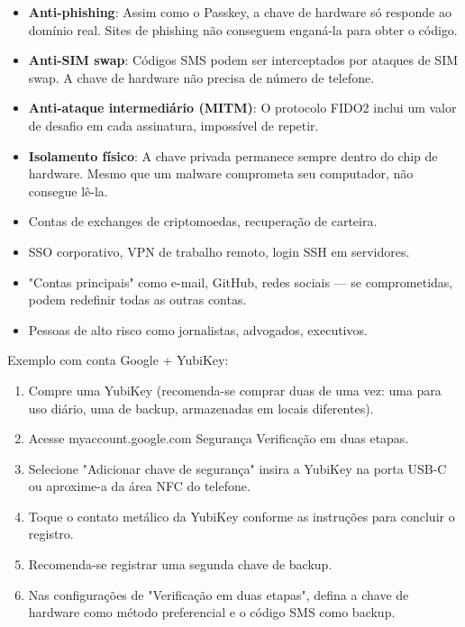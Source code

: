 
\begin{itemize}
  \item \textbf{Anti-phishing}: Assim como o Passkey, a chave de hardware só responde ao domínio real. Sites de phishing não conseguem enganá-la para obter o código.
  \item \textbf{Anti-SIM swap}: Códigos SMS podem ser interceptados por ataques de SIM swap. A chave de hardware não precisa de número de telefone.
  \item \textbf{Anti-ataque intermediário (MITM)}: O protocolo FIDO2 inclui um valor de desafio em cada assinatura, impossível de repetir.
  \item \textbf{Isolamento físico}: A chave privada permanece sempre dentro do chip de hardware. Mesmo que um malware comprometa seu computador, não consegue lê-la.
\end{itemize}


\begin{itemize}
  \item Contas de exchanges de criptomoedas, recuperação de carteira.
  \item SSO corporativo, VPN de trabalho remoto, login SSH em servidores.
  \item "Contas principais" como e-mail, GitHub, redes sociais — se comprometidas, podem redefinir todas as outras contas.
  \item Pessoas de alto risco como jornalistas, advogados, executivos.
\end{itemize}


Exemplo com conta Google + YubiKey:

\begin{enumerate}
  \item Compre uma YubiKey (recomenda-se comprar duas de uma vez: uma para uso diário, uma de backup, armazenadas em locais diferentes).
  \item Acesse myaccount.google.com Segurança Verificação em duas etapas.
  \item Selecione "Adicionar chave de segurança" insira a YubiKey na porta USB-C ou aproxime-a da área NFC do telefone.
  \item Toque o contato metálico da YubiKey conforme as instruções para concluir o registro.
  \item Recomenda-se registrar uma segunda chave de backup.
  \item Nas configurações de "Verificação em duas etapas", defina a chave de hardware como método preferencial e o código SMS como backup.
\end{enumerate}

